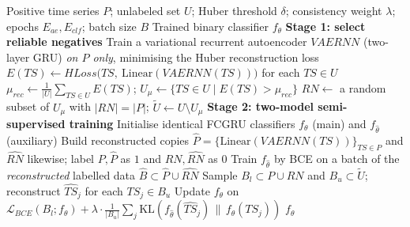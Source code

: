 \documentclass{article}
\begin{document}
\begin{algorithm}[!h]
\renewcommand{\algorithmicrequire}{\textbf{Input:}}
\renewcommand{\algorithmicensure}{\textbf{Output:}}
	\caption{PUL-SITS: PU learning for satellite image time series}
	\begin{algorithmic}[1]
	    \REQUIRE
	    Positive time series $P$; unlabeled set $U$; Huber threshold $\delta$;
	    consistency weight $\lambda$; epochs $E_{ae},E_{clf}$; batch size $B$
	    \ENSURE
	    Trained binary classifier $f_{\theta}$
	    \STATE \textbf{Stage 1: select reliable negatives}
	    \STATE Train a variational recurrent autoencoder $VAERNN$ (two-layer GRU)
	    \emph{on $P$ only}, minimising the Huber reconstruction loss %
	    \STATE $E(TS)\leftarrow HLoss\big(TS,\ \mathrm{Linear}(VAERNN(TS))\big)$ for each $TS\in U$
	    \STATE $\mu_{rec}\leftarrow \frac{1}{|U|}\sum_{TS\in U}E(TS)$;\quad
	    $U_{\mu}\leftarrow\{TS\in U\mid E(TS)>\mu_{rec}\}$ %
	    \STATE $RN\leftarrow$ a random subset of $U_{\mu}$ with $|RN|=|P|$;\quad
	    $\tilde{U}\leftarrow U\setminus U_{\mu}$ %
	    \STATE \textbf{Stage 2: two-model semi-supervised training}
	    \STATE Initialise identical FCGRU classifiers $f_{\theta}$ (main) and $f_{\hat{\theta}}$ (auxiliary)
	    \STATE Build reconstructed copies
	    $\hat{P}=\{\mathrm{Linear}(VAERNN(TS))\}_{TS\in P}$ and $\hat{RN}$ likewise;
	    label $P,\hat{P}$ as $1$ and $RN,\hat{RN}$ as $0$ %
	    \STATE Train $f_{\hat{\theta}}$ by BCE on a batch of the \emph{reconstructed} labelled data
	    $\hat{B}\subset\hat{P}\cup\hat{RN}$
	    \STATE Sample $B_{l}\subset P\cup RN$ and $B_{u}\subset\tilde{U}$;
	    reconstruct $\hat{TS}_{j}$ for each $TS_{j}\in B_{u}$
	    \STATE Update $f_{\theta}$ on
	    $\mathcal{L}_{BCE}(B_{l};f_{\theta})
	    +\lambda\cdot\frac{1}{|B_{u}|}\sum_{j}\mathrm{KL}\!\left(f_{\hat{\theta}}(\hat{TS}_{j})\,\|\,f_{\theta}(TS_{j})\right)$ %
	    \ENDFOR
	    \ENDFOR
		\RETURN $f_{\theta}$
	\end{algorithmic}
\end{algorithm}
\end{document}
